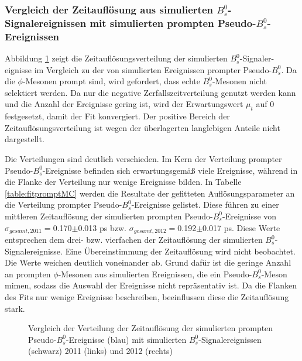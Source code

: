 \documentclass{article}
\begin{document}
\subsubsection[Vergleich der Zeitauflösung von simulierten $B_s^0$-Signalereig-nissen mit simulierten prompten Pseudo-$B_s^0$-Ereignissen]{Vergleich der Zeitauflösung aus simulierten $B_s^0$-Signalereignissen mit simulierten prompten Pseudo-$B_s^0$-Ereignissen}
Abbildung \ref{fig:MCprompttres} zeigt die Zeitauflösungsverteilung der simulierten $B_s^0$-Signaler-eignisse im Vergleich zu der von simulierten Ereignissen prompter Pseudo-$B_s^0$. Da die $\phi$-Mesonen prompt sind, wird gefordert, dass echte $B_s^0$-Mesonen nicht selektiert werden. Da nur die negative Zerfallszeitverteilung genutzt werden kann und die Anzahl der Ereignisse gering ist, wird der Erwartungswert $\mu_t$ auf 0 festgesetzt, damit der Fit konvergiert. Der positive Bereich der Zeitauflösungsverteilung ist wegen der überlagerten langlebigen Anteile nicht dargestellt.

Die Verteilungen sind deutlich verschieden. Im Kern der Verteilung prompter Pseudo-$B_s^0$-Ereignisse befinden sich erwartungsgemäß viele Ereignisse, während in die Flanke der Verteilung nur wenige Ereignisse bilden. In Tabelle \ref{table:fitpromptMC} werden die Resultate der gefitteten Auflösungsparameter an die Verteilung prompter Pseudo-$B_s^0$-Ereignisse gelistet. Diese führen zu einer mittleren Zeitauflösung der simulierten prompten Pseudo-$B_s^0$-Ereignisse von $\sigma_{gesamt,2011}=$0.170$\pm$0.013 ps bzw. $\sigma_{gesamt,2012}=$0.192$\pm$0.017 ps. Diese Werte entsprechen dem drei- bzw. vierfachen der Zeitauflösung der simulierten $B_s^0$-Signalereignisse. Eine Übereinstimmung der Zeitauflösung wird nicht beobachtet. Die Werte weichen deutlich voneinander ab. Grund dafür ist die geringe Anzahl an prompten $\phi$-Mesonen aus simulierten Ereignissen, die ein Pseudo-$B_s^0$-Meson mimen, sodass die Auswahl der Ereignisse nicht repräsentativ ist. Da die Flanken des Fits nur wenige Ereignisse beschreiben, beeinflussen diese die Zeitauflösung stark. 

\begin{figure}[h!]
\caption{Vergleich der Verteilung der Zeitauflösung der simulierten prompten Pseudo-$B_s^0$-Ereignisse (blau) mit simulierten $B_s^0$-Signalereignissen (schwarz) 2011 (links) und 2012 (rechts)}
\label{fig:MCprompttres}
\end{figure} 
\end{document}
